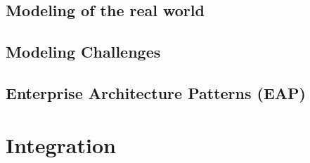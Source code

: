 \documentclass[
     12pt,         %
     a4paper,      %
     BCOR10mm,     %
     DIV14,        %
aragraph skip instad of paragraph indent
     ]{scrreprt}
\begin{document}
\subsection{Modeling of the real world}

\subsection{Modeling Challenges}

\subsection{Enterprise Architecture Patterns (EAP)}


\section{Integration}
\end{document}
